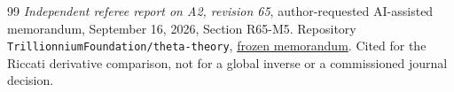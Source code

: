 \begin{thebibliography}{99}
\emph{Independent referee report on A2, revision 65},
author-requested AI-assisted memorandum, September 16, 2026,
Section R65-M5. Repository
\texttt{Trillionnium\allowbreak Foundation/\allowbreak theta-theory},
\href{https://github.com/TrillionniumFoundation/theta-theory/blob/7f4603531f7b97a23ce627fec47b7ddc5f4f9912/reviews/a2-v65-independent-harsh-top4-2026-09-16/REFEREE_REPORT.md}{frozen memorandum}.
Cited for the Riccati derivative comparison, not for a global inverse
or a commissioned journal decision.

\end{thebibliography}
